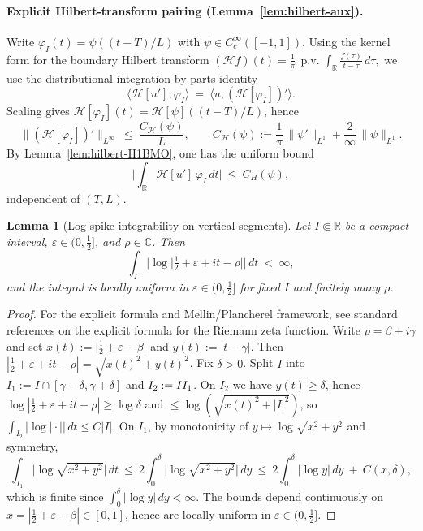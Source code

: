\documentclass[11pt]{article}
\newtheorem{lemma}[theorem]{Lemma}
\theoremstyle{definition}
\theoremstyle{remark}
\newcommand{\C}{\mathbb{C}}
\newcommand{\R}{\mathbb{R}}
\begin{document}
\paragraph{Explicit Hilbert-transform pairing (Lemma~\ref{lem:hilbert-aux}).}\label{lem:hilbert}
Write $\varphi_I(t)=\psi((t-T)/L)$ with $\psi\in C_c^\infty([-1,1])$. Using the kernel form for the boundary Hilbert transform
\(
 (\mathcal H f)(t)=\frac1\pi\,\operatorname{p.v.}\!\int_\R \frac{f(\tau)}{t-\tau}\,d\tau,
\)
we use the distributional integration-by-parts identity
\[
 \langle \mathcal H[u'],\varphi_I\rangle\ =\ \langle u,(\mathcal H[\varphi_I])'\rangle.
\]
Scaling gives $\mathcal H[\varphi_I](t)=\mathcal H[\psi]((t-T)/L)$, hence
\[
 \|(\mathcal H[\varphi_I])'\|_{L^\infty}\ \le\ \frac{C_{\mathcal H}(\psi)}{L},\qquad C_{\mathcal H}(\psi):=\frac{1}{\pi}\,\|\psi'\|_{L^1}+\frac{2}{\infty}\,\|\psi\|_{L^1}.
\]
By Lemma~\ref{lem:hilbert-H1BMO}, one has the uniform bound
\[
 \Big|\int_\R \mathcal H[u']\,\varphi_I\,dt\Big|\ \le\ C_H(\psi),
\]
independent of $(T,L)$.
\begin{lemma}[Log-spike integrability on vertical segments]\label{lem:log-spike-int}
Let $I\Subset\R$ be a compact interval, $\varepsilon\in(0,\tfrac12]$, and $\rho\in\C$. Then
\[
 \int_I \big|\log\big|\tfrac12+\varepsilon+it-\rho\big|\big|\,dt\ <\ \infty,
\]
and the integral is locally uniform in $\varepsilon\in(0,\tfrac12]$ for fixed $I$ and finitely many $\rho$.
\end{lemma}
\begin{proof}
For the explicit formula and Mellin/Plancherel framework, see standard references on the explicit formula for the Riemann zeta function.
Write $\rho=\beta+i\gamma$ and set $x(t):=\big|\tfrac12+\varepsilon-\beta\big|$ and $y(t):=|t-\gamma|$. Then $|\tfrac12+\varepsilon+it-\rho|=\sqrt{x(t)^2+y(t)^2}$. Fix $\delta>0$. Split $I$ into $I_1:=I\cap[\gamma-\delta,\gamma+\delta]$ and $I_2:=I\\I_1$. On $I_2$ we have $y(t)\ge \delta$, hence $\log|\tfrac12+\varepsilon+it-\rho|\ge \log\delta$ and $\le \log(\sqrt{x(t)^2+|I|^2})$, so $\int_{I_2}|\log|\cdot||\,dt\le C|I|$. On $I_1$, by monotonicity of $y\mapsto \log\sqrt{x^2+y^2}$ and symmetry,
\[
 \int_{I_1}\!\big|\log\sqrt{x^2+y^2}\big|\,dt\ \le\ 2\int_0^{\delta} \big|\log\sqrt{x^2+y^2}\big|\,dy\ \le\ 2\int_0^{\delta} \big|\log y\big|\,dy\ +\ C(x,\delta),
\]
which is finite since $\int_0^{\delta}|\log y|\,dy<\infty$. The bounds depend continuously on $x=|\tfrac12+\varepsilon-\beta|\in[0,1]$, hence are locally uniform in $\varepsilon\in(0,\tfrac12]$.
\end{proof}
\end{document}
